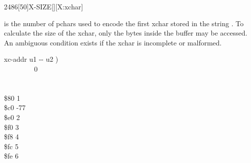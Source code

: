 \begin{worddef}{2486}[50]{X-SIZE}[][X:xchar]
\item {}

	 is the number of pchars used to encode the first xchar
	stored in the string .  To calculate the size of
	the xchar, only the bytes inside the buffer may be accessed.  An
	ambiguous condition exists if the xchar is incomplete or malformed.

	\begin{implement}
	\word{:}   xc-addr u1 -{}- u2 ) \\
	\tab {} ~~~~~~~~  0   \\
	\tab {}  \\
	\tab {} \\
	\tab {} \$80    1   \\
	\tab {} \$c0   -77  ~~ \\
	\tab {} \$e0    2   \\
	\tab {} \$f0    3   \\
	\tab {} \$f8    4   \\
	\tab {} \$fc    5   \\
	\tab {} \$fe    6   \\
	  \word{;}
	\end{implement}
\end{worddef}


